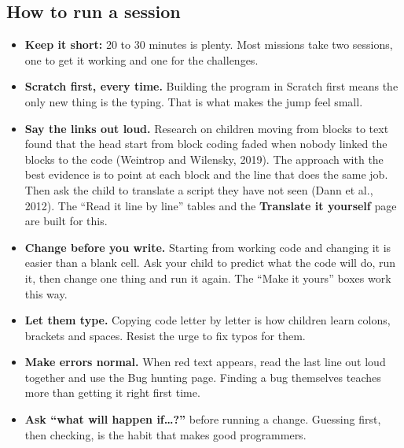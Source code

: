 \documentclass[12pt,a4paper]{article}
\begin{document}
\subsection*{How to run a session}
\begin{itemize}
  \item \textbf{Keep it short:} 20 to 30 minutes is plenty. Most missions take two sessions, one to get it working and one for the challenges.
  \item \textbf{Scratch first, every time.} Building the program in Scratch first means the only new thing is the typing. That is what makes the jump feel small.
  \item \textbf{Say the links out loud.} Research on children moving from blocks to text found that the head start from block coding faded when nobody linked the blocks to the code (Weintrop and Wilensky, 2019). The approach with the best evidence is to point at each block and the line that does the same job. Then ask the child to translate a script they have not seen (Dann et al., 2012). The ``Read it line by line'' tables and the \textbf{Translate it yourself} page are built for this.
  \item \textbf{Change before you write.} Starting from working code and changing it is easier than a blank cell. Ask your child to predict what the code will do, run it, then change one thing and run it again. The ``Make it yours'' boxes work this way.
  \item \textbf{Let them type.} Copying code letter by letter is how children learn colons, brackets and spaces. Resist the urge to fix typos for them.
  \item \textbf{Make errors normal.} When red text appears, read the last line out loud together and use the Bug hunting page. Finding a bug themselves teaches more than getting it right first time.
  \item \textbf{Ask ``what will happen if\ldots?''} before running a change. Guessing first, then checking, is the habit that makes good programmers.
\end{itemize}
\end{document}
